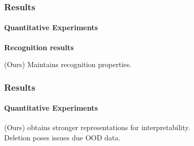 \begin{frame}[t]
    \frametitle{Results}
    \framesubtitle{Quantitative Experiments}    
    \small \textbf{Recognition results}
    
     (Ours) Maintains recognition properties.
\end{frame}
\begin{frame}[t]
    \frametitle{Results}
    \framesubtitle{Quantitative Experiments}    
    \small
    
    \pause
     (Ours) obtains stronger representations for interpretability.\\
    Deletion poses issues due OOD data.
\end{frame}